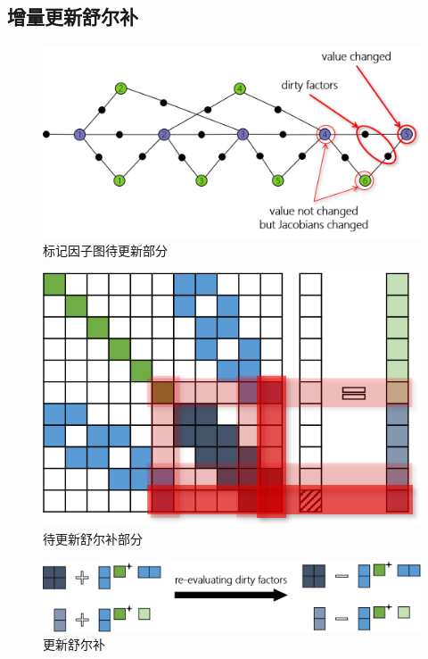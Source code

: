 \subsection{增量更新舒尔补}

\begin{figure}[htb]
    \centering
    \includegraphics[width=\textwidth]{figs/factor_graph_dirty.png}
    \caption{标记因子图待更新部分}
\end{figure}

\begin{figure}[htb]
    \centering
    \includegraphics{figs/normal_eq_cursed.png}
    \caption{待更新舒尔补部分}
\end{figure}

\begin{figure}[htb]
    \centering
    \includegraphics[width=\textwidth]{figs/schur_update.png}
    \caption{更新舒尔补}
\end{figure}

